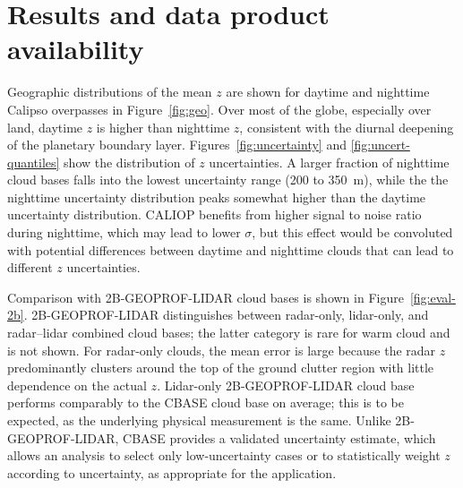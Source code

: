 \documentclass[essd,manuscript]{copernicus}\usepackage[]{graphicx}\usepackage[]{color}
\newcommand{\hlnum}[1]{\textcolor[rgb]{0.686,0.059,0.569}{#1}}%
\newcommand\comment[2]{\{\hlnum{ \textit{#1}: #2}\}}
\newcommand\commentjm[1]{\comment{$j_\mu$}{#1}}
\newcommand\CBH{\ensuremath{z}}
\begin{document}

\section{Results and data product availability}
\label{sec:results}

Geographic distributions of the mean \CBH{} are shown for daytime and nighttime
Calipso overpasses in Figure~\ref{fig:geo}.  Over most of the globe, especially
over land, daytime \CBH{} is higher than nighttime \CBH{}, consistent with the diurnal
deepening of the planetary boundary layer.  Figures~\ref{fig:uncertainty} and
\ref{fig:uncert-quantiles} show the distribution of \CBH{} uncertainties.  A larger
fraction of nighttime cloud bases falls into the lowest uncertainty range (200
to 350~m), while the the nighttime uncertainty distribution peaks somewhat
higher than the daytime uncertainty distribution.  CALIOP benefits from higher
signal to noise ratio during nighttime, which may lead
to lower $\sigma$, but this effect would be convoluted with potential
differences between daytime and nighttime clouds that can lead to different \CBH{}
uncertainties.  %

Comparison with 2B-GEOPROF-LIDAR cloud bases is shown in
Figure~\ref{fig:eval-2b}.  2B-GEOPROF-LIDAR distinguishes between radar-only,
lidar-only, and radar--lidar combined cloud bases; the latter category is rare
for warm cloud and is not shown.  For radar-only clouds, the mean error is large
because the radar \CBH{} predominantly clusters around the top of the ground
clutter region with little dependence on the actual \CBH{}.  Lidar-only
2B-GEOPROF-LIDAR cloud base performs comparably to the CBASE cloud base on
average; this is to be expected, as the underlying physical measurement is the
same.  Unlike 2B-GEOPROF-LIDAR, CBASE provides a validated uncertainty estimate,
which allows an analysis to select only low-uncertainty cases or to
statistically weight \CBH{} according to uncertainty, as appropriate for the
application.
\end{document}
